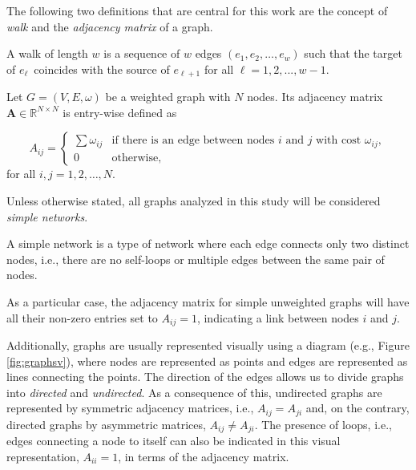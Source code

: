 The following two definitions that are central for this work are the concept of \textit{walk} and the \textit{adjacency matrix} of a graph.  

\begin{definition}
    A walk of length $w$ is a sequence of $w$ edges $(e_1, e_2, \dots, e_w)$ such that the target of $e_\ell$ coincides with the source of $e_{\ell+1}$ for all $\ell=1, 2, ..., w−1$.
\end{definition}
  
\begin{definition}
	Let $G =(V, E, \omega)$ be a weighted graph with $N$ nodes. Its adjacency matrix $\mathbf{A}\in\mathbb{R}^{N\times N}$ is entry-wise defined as
 
 \begin{equation}
  A_{ij} =
    \begin{cases}
      \sum\omega_{ij} & \text{if there is an edge between nodes $i$ and $j$ with cost $\omega_{ij}$},\\
      0 & \text{otherwise},
    \end{cases}       
\end{equation}
for all $i, j = 1,2,\dots, N$.
\end{definition}

Unless otherwise stated, all graphs analyzed in this study will be considered \textit{simple networks}.

\begin{definition}
    A simple network is a type of network where each edge connects only two distinct nodes, i.e., there are no self-loops or multiple edges between the same pair of nodes. 
\end{definition}
As a particular case, the adjacency matrix for simple unweighted graphs will have all their non-zero entries set to $A_{ij}=1$, indicating a link between nodes $i$ and $j$.

Additionally, graphs are usually represented visually using a diagram (e.g., Figure \ref{fig:graphsv}), where nodes are represented as points and edges are represented as lines connecting the points. The direction of the edges allows us to divide graphs into \textit{directed} and \textit{undirected}. As a consequence of this, undirected graphs are represented by symmetric adjacency matrices, i.e., $A_{ij}=A_{ji}$ and, on the contrary, directed graphs by asymmetric matrices, $A_{ij}\ne A_{ji}$. The presence of loops, i.e., edges connecting a node to itself can also be indicated in this visual representation, $A_{ii} = 1$, in terms of the adjacency matrix.

